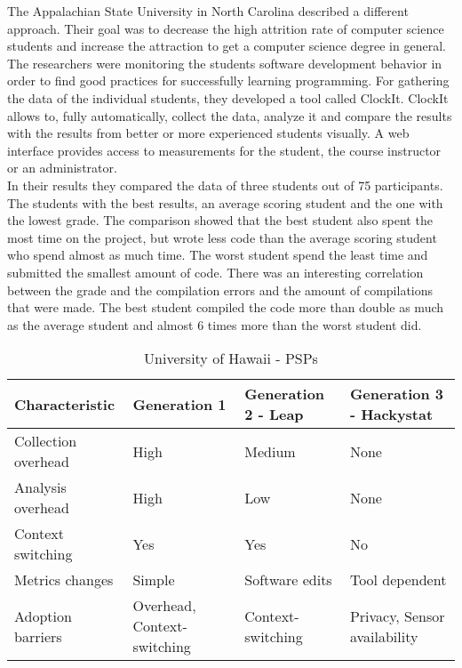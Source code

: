 The Appalachian State University in North Carolina described a different approach. Their goal was to decrease the high attrition rate of computer science students and increase the attraction to get a computer science degree in general.\\
The researchers were monitoring the students software development behavior in order to find good practices for successfully learning programming. For gathering the data of the individual students, they developed a tool called ClockIt. ClockIt allows to, fully automatically, collect the data, analyze it and compare the results with the results from better or more experienced students visually. A web interface provides access to measurements for the student, the course instructor or an administrator.\\
In their results they compared the data of three students out of 75 participants. The students with the best results, an average scoring student and the one with the lowest grade. 
The comparison showed that the best student also spent the most time on the project, but wrote less code than the average scoring student who spend almost as much time. The worst student spend the least time and submitted the smallest amount of code. There was an interesting correlation between the grade and the compilation errors and the amount of compilations that were made. The best student compiled the code more than double as much as the average student and almost 6 times more than the worst student did. \cite{norris2008clockit}

\begin{table}[ht]
  \begin{tabular}{|P{5cm}|P{3cm}|P{3cm}|P{3cm}|}
  \hline
   \textbf{Characteristic}	& \textbf{Generation 1} & \textbf{Generation 2 - Leap} & \textbf{Generation 3 - Hackystat} \\ \hline
	Collection overhead	& High 											& Medium  				& None \\ \hline
	Analysis overhead	& High 											& Low 						& None \\ \hline
	Context switching	& Yes 											& Yes 						& No \\ \hline
	Metrics changes		& Simple 										& Software edits		& Tool dependent \\ \hline
	Adoption barriers		& Overhead, Context-switching 	& Context-switching	& Privacy, Sensor availability \\ \hline
  \end{tabular}
  \newline\newline
  \caption{University of Hawaii - PSPs}\label{psps}
\end{table}

